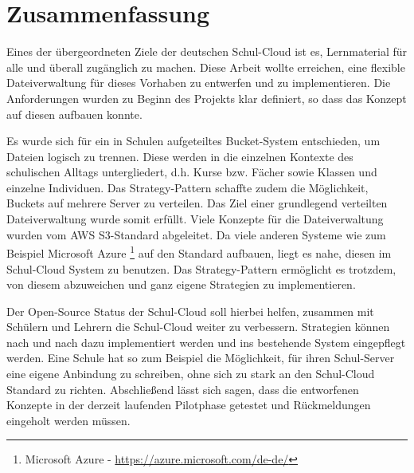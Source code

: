 \section{Zusammenfassung}
\label{sec:conclusion}

Eines der übergeordneten Ziele der deutschen Schul-Cloud ist es, Lernmaterial für alle und überall zugänglich zu machen. Diese Arbeit wollte erreichen, eine flexible Dateiverwaltung für dieses Vorhaben zu entwerfen und zu implementieren. Die Anforderungen wurden zu Beginn des Projekts klar definiert, so dass das Konzept auf diesen aufbauen konnte.

 Es wurde sich für ein in Schulen aufgeteiltes Bucket-System entschieden, um Dateien logisch zu trennen. Diese werden in die einzelnen Kontexte des schulischen Alltags untergliedert, d.h. Kurse bzw. Fächer sowie Klassen und einzelne Individuen. Das Strategy-Pattern schaffte zudem die Möglichkeit, Buckets auf mehrere Server zu verteilen. Das Ziel einer grundlegend verteilten Dateiverwaltung wurde somit erfüllt. Viele Konzepte für die Dateiverwaltung wurden vom AWS S3-Standard abgeleitet. Da viele anderen Systeme wie zum Beispiel Microsoft Azure \footnote{Microsoft Azure - \url{https://azure.microsoft.com/de-de/}} auf den Standard aufbauen, liegt es nahe, diesen im Schul-Cloud System zu benutzen. Das Strategy-Pattern ermöglicht es trotzdem, von diesem abzuweichen und ganz eigene Strategien zu implementieren.

Der Open-Source Status der Schul-Cloud soll hierbei helfen, zusammen mit Schülern und Lehrern die Schul-Cloud weiter zu verbessern. Strategien können nach und nach dazu implementiert werden und ins bestehende System eingepflegt werden. Eine Schule hat so zum Beispiel die Möglichkeit, für ihren Schul-Server eine eigene Anbindung zu schreiben, ohne sich zu stark an den Schul-Cloud Standard zu richten. Abschließend lässt sich sagen, dass die entworfenen Konzepte in der derzeit laufenden Pilotphase getestet und Rückmeldungen eingeholt werden müssen.

\clearpage
